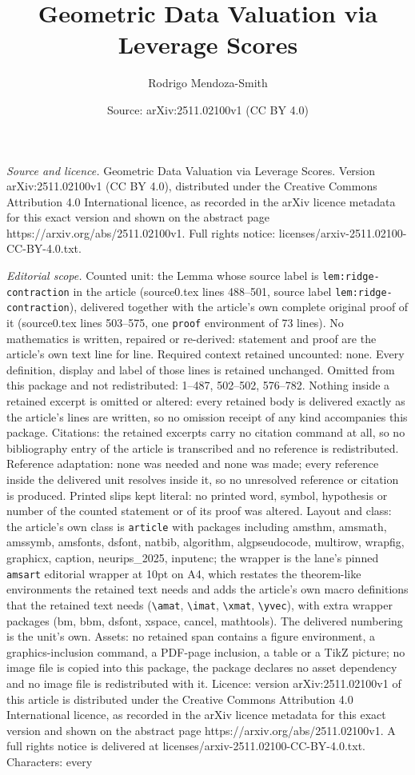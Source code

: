 \documentclass[10pt,a4paper]{amsart}
\title[Geometric Data Valuation via Leverage Scores]{Geometric Data Valuation via Leverage Scores}
\author{Rodrigo Mendoza-Smith}
\date{Source: arXiv:2511.02100v1 (CC BY 4.0)}
\begin{document}
\maketitle

\noindent\emph{Source and licence.} Geometric Data Valuation via Leverage Scores. Version arXiv:2511.02100v1 (CC BY 4.0), distributed under the Creative Commons Attribution 4.0 International licence, as recorded in the arXiv licence metadata for this exact version and shown on the abstract page https://arxiv.org/abs/2511.02100v1. Full rights notice: licenses/arxiv-2511.02100-CC-BY-4.0.txt.\par\smallskip

\noindent\textit{Editorial scope.} Counted unit: the Lemma whose source label is \texttt{lem:ridge-contraction} in the article (source0.tex lines 488--501, source label \texttt{lem:ridge-contraction}), delivered together with the article's own complete original proof of it (source0.tex lines 503--575, one \texttt{proof} environment of 73 lines). No mathematics is written, repaired or re-derived: statement and proof are the article's own text line for line. Required context retained uncounted: none. Every definition, display and label of those lines is retained unchanged. Omitted from this package and not redistributed: 1--487, 502--502, 576--782. Nothing inside a retained excerpt is omitted or altered: every retained body is delivered exactly as the article's lines are written, so no omission receipt of any kind accompanies this package. Citations: the retained excerpts carry no citation command at all, so no bibliography entry of the article is transcribed and no reference is redistributed. Reference adaptation: none was needed and none was made; every reference inside the delivered unit resolves inside it, so no unresolved reference or citation is produced. Printed slips kept literal: no printed word, symbol, hypothesis or number of the counted statement or of its proof was altered. Layout and class: the article's own class is \texttt{article} with packages including amsthm, amsmath, amssymb, amsfonts, dsfont, natbib, algorithm, algpseudocode, multirow, wrapfig, graphicx, caption, neurips\_2025, inputenc; the wrapper is the lane's pinned \texttt{amsart} editorial wrapper at 10pt on A4, which restates the theorem-like environments the retained text needs and adds the article's own macro definitions that the retained text needs (\texttt{\textbackslash amat}, \texttt{\textbackslash imat}, \texttt{\textbackslash xmat}, \texttt{\textbackslash yvec}), with extra wrapper packages (bm, bbm, dsfont, xspace, cancel, mathtools). The delivered numbering is the unit's own. Assets: no retained span contains a figure environment, a graphics-inclusion command, a PDF-page inclusion, a table or a TikZ picture; no image file is copied into this package, the package declares no asset dependency and no image file is redistributed with it. Licence: version arXiv:2511.02100v1 of this article is distributed under the Creative Commons Attribution 4.0 International licence, as recorded in the arXiv licence metadata for this exact version and shown on the abstract page https://arxiv.org/abs/2511.02100v1. A full rights notice is delivered at licenses/arxiv-2511.02100-CC-BY-4.0.txt. Characters: every 
\end{document}
